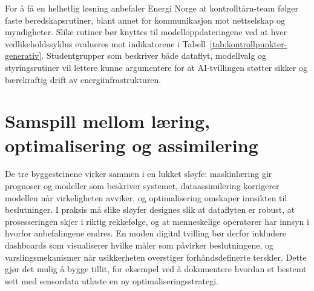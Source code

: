 For å få en helhetlig løsning anbefaler Energi Norge at kontrolltårn-team følger faste beredskapsrutiner, blant annet for kommunikasjon mot nettselskap og myndigheter.\citep{energinorge2023beredskap} Slike rutiner bør knyttes til modelloppdateringene ved at hver vedlikeholdssyklus evalueres mot indikatorene i Tabell~\ref{tab:kontrollpunkter-generativ}. Studentgrupper som beskriver både dataflyt, modellvalg og styringsrutiner vil lettere kunne argumentere for at AI-tvillingen støtter sikker og bærekraftig drift av energiinfrastrukturen.

\section{Samspill mellom læring, optimalisering og assimilering}
De tre byggesteinene virker sammen i en lukket sløyfe: maskinlæring gir prognoser og modeller som beskriver systemet, dataassimilering korrigerer modellen når virkeligheten avviker, og optimalisering omskaper innsikten til beslutninger. I praksis må slike sløyfer designes slik at dataflyten er robust, at prosesseringen skjer i riktig rekkefølge, og at menneskelige operatører har innsyn i hvorfor anbefalingene endres. En moden digital tvilling bør derfor inkludere dashboards som visualiserer hvilke måler som påvirker beslutningene, og varslingsmekanismer når usikkerheten overstiger forhåndsdefinerte terskler. Dette gjør det mulig å bygge tillit, for eksempel ved å dokumentere hvordan et bestemt sett med sensordata utløste en ny optimaliseringsstrategi.

